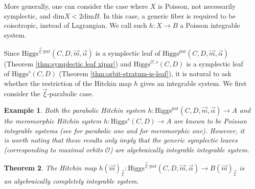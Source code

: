 \documentclass[11pt]{amsart}
\theoremstyle{plain}
\newtheorem{theorem}{Theorem}[section]
\newtheorem{example}[theorem]{Example}
\theoremstyle{definition}
\theoremstyle{remark}
\newcommand{\cO}{\mathcal O}
\newcommand{\Higgs}{\mathrm{Higgs}}
\def\a{\alpha}
\def\dim{\mathrm{dim}}
\def\vxi{\vec{\xi}}
\def\vm{\vec{m}}
\def\va{\vec{\a}}
\begin{document}
More generally, one can consider the case where $X$ is Poisson, not necessarily symplectic, and $\dim X < 2\dim B$. In this case, a generic fiber is required to be coisotropic, instead of Lagrangian. We call such $h:X \to B$ a Poisson integrable system. 

Since $\Higgs^{\vxi\text{-par}}(C,D,\vm,\va)$ is a symplectic leaf of $\Higgs^{\text{par}}(C,D,\vm,\va)$ (Theorem \ref{thm:symplectic leaf xipar}) and $\Higgs^{\cO,s}(C,D)$ is a symplectic leaf of $\Higgs^{s}(C,D)$ (Theorem \ref{thm:orbit-stratum-is-leaf}), it is natural to ask whether the restriction of the Hitchin map $h$ gives an integrable system. We first consider the $\vxi$-parabolic case. 
\begin{example}\label{ex:meromorphic integrable}
    Both the parabolic Hitchin system $h:\Higgs^{\text{par}}(C,D,\vm,\va) \to A$ and  the meromorphic Hitchin system $h:\Higgs^{s}(C,D) \to A$ are known to be Poisson integrable systems (see \cite{logaresMartens} for parabolic one and \cite{markmanspectral} for meromorphic one). However, it is worth noting that these results only imply that the generic symplectic leaves (corresponding to maximal orbits $\cO$) are algebraically integrable integrable system.  
    
\end{example}

\begin{theorem}\label{thm:holosym and integrable}
	 The Hitchin map
	$h(\vm)_{\vxi}:\Higgs^{\vec\xi\text{-par}}(C,D,\vec m,\vec\alpha)\to B(\vec m)_{\vec\xi}$
	is an algebraically completely integrable system.
\end{theorem}
\end{document}

